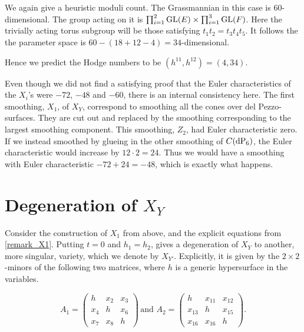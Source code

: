\begin{remark}
We again give a heuristic moduli count. The Grassmannian in this case is $60$-dimensional. The group acting on it is $\prod^2_{i=1} \operatorname{GL}(E) \times \prod^3_{i=1} \operatorname{GL}(F)$. Here the trivially acting torus subgroup will be those satisfying $t_1t_2=t_3t_4t_5$. It follows the the parameter space is $60-(18+12-4)=34$-dimensional.

Hence we predict the Hodge numbers to be $(h^{11},h^{12})=(4,34)$.
\end{remark}

\begin{remark}
Even though we did not find a satisfying proof that the Euler characteristics of the $X_i$'s were $-72$, $-48$ and $-60$, there is an internal consistency here. The first smoothing, $X_1$, of $X_Y$, correspond to smoothing all the cones over del Pezzo-surfaces. They are cut out and replaced by the smoothing corresponding to the largest smoothing component. This smoothing, $Z_2$, had Euler characteristic zero. If we instead smoothed by glueing in the other smoothing of $C(\dP6)$, the Euler characteristic would increase by $12 \cdot 2=24$. Thus we would have a smoothing with Euler characteristic $-72+24=-48$, which is exactly what happens.
\end{remark}

\section{Degeneration of $X_Y$}
\label{sec:degenjoin}

Consider the construction of $X_1$ from above, and the explicit equations from \cref{remark_X1}. Putting $t=0$ and $h_1=h_2$, gives a degeneration of $X_Y$ to another, more singular, variety, which we denote by $X_{Y'}$. Explicitly, it is given by the $2 \times 2$-minors of the following two matrices, where $h$ is a generic hypersurface in the variables.

\[
A_1 = \begin{pmatrix}
h   & x_2 & x_3 \\
x_4 & h  & x_6 \\
x_7 & x_8 & h
\end{pmatrix}\,
\text{and }
A_2 = \begin{pmatrix}
h & x_{11} & x_{12} \\
x_{13} & h & x_{15} \\
x_{16} & x_{16} & h
\end{pmatrix}.
\]

